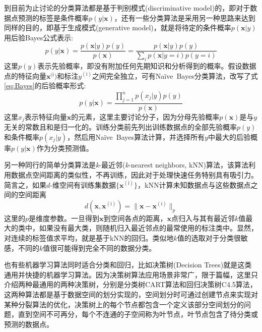 到目前为止讨论的分类算法都是基于判别模式\textrm{(discriminative model)}的，即对于数据点预测的标签是条件概率$p(y|\mathbf{x})$，还有一些分类算法是采用另一种思路来达到同样的目的，即基于生成模式\textrm{(generative model)}，就是将待定的条件概率$p(\mathbf{x}|y)$用后验\textrm{Bayes}公式表示:
\begin{equation}
	p(y|\mathbf{x})=\dfrac{p(\mathbf{x}|y)p(y)}{p(\mathbf{x})}=\dfrac{p(\mathbf{x}|y)p(y)}{\sum\limits_ip(\mathbf{x}|y=i)p(y=i)}
	\label{eq:Bayes}
\end{equation}
这里$p(y)$表示先验概率，即没有附加任何先期知识和分析得到的概率。假设数据点的特征向量$\mathbf{x}^{(\mathrm{i}})$和标注$y^{(\mathrm{i})}$之间完全独立，可有\textrm{Na\"ive~Bayes}分类算法\cite{Naive-Bayes}，改写了式\eqref{eq:Bayes}的后验概率形式:
\begin{equation}
	p(y|\mathbf{x})=\dfrac{\prod\limits_{j=1}^np(x_j|y)p(y)}{p(\mathbf{x})}
	\label{eq:Naive-Bayes}
\end{equation}
这里$x_j$表示特征向量$\mathbf{x}$的元素，这里主要讨论分子，因为分母先验概率$p(\mathbf{x})$是与$y$无关的常数且和是归一化的。训练分类前先列出训练数据点的全部先验概率$p(y)$和条件概率$p(x_j|y)$，然后用\textrm{Na\"ive~Bayes}算法计算，并选择所有$y$中最大的后验概率$p(y|\mathbf{x})$作为分类预测值。

另一种同行的简单分类算法是\textit{k}-最近邻(\textit{k}-\textrm{nearest neighbors, kNN})算法，该算法利用数据点空间距离的类似性，不再训练，因此对于处理快速任务特别具有吸引力。简言之，如果$d$-维空间有训练集数据$\{\mathbf{x}^{(\mathrm{i})}\}$，\textrm{kNN}计算未知数据点与这些数据点之间的空间距离
\begin{displaymath}
	d(\mathbf{x},\mathbf{x}^{(\mathrm{i})})=\|\mathbf{x}-\mathbf{x}^{(\mathrm{i})}\|_p
\end{displaymath}
这里的$p$是维度参数。一旦得到$\mathbf{x}$到空间各点的距离，$\mathbf{x}$点归入与其有最近邻$k$值最大的类中，如果没有最大类，则随机归入最近邻点的最常使用的标注类中。显然，对连续的标签值求平均，就是基于\textrm{kNN}的回归。类似地$k$值的选取对于分类很敏感，不同的$k$值很可能得到完全不同的数据分类。

也有些机器学习算法同时适合分类和回归，比如决策树\textrm{(Decision Trees)}就是这类通用并快捷的机器学习算法。因为决策树算法应用场景非常广，限于篇幅，这里只介绍两种最通用的两种决策树，分别是分类树\textrm{CART}算法\cite{ML_CART}和回归决策树\textrm{C4.5}算法\cite{ML_C4.5}，这两种算法都是基于数据空间的划分实现的，空间划分时可通过创建节点来实现对某种分裂算法的优化，决策树上的每个节点都包含一个定义该部分空间划分的问题，直到空间不可再分，每个不连通的子空间称为叶节点，叶节点包含了待分类或预测的数据点。


